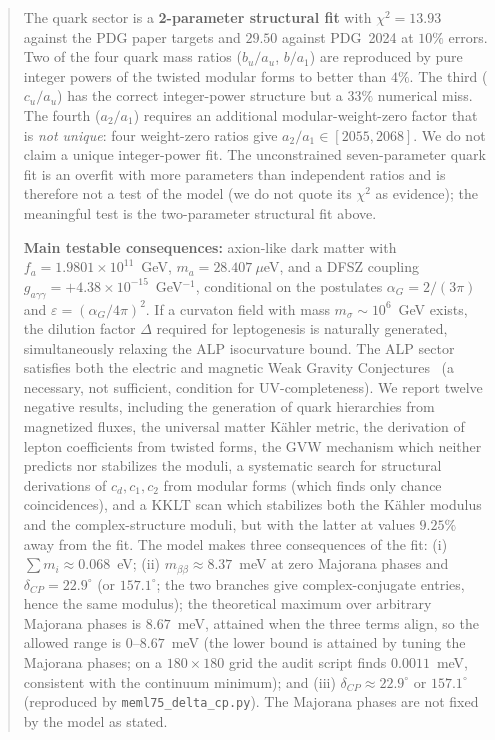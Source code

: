 \documentclass[12pt,a4paper]{article}
\numberwithin{equation}{section}
\begin{document}
\begin{abstract}
The quark sector is a \textbf{2-parameter structural fit} with
\(\chi^2 = 13.93\) against the PDG paper targets and \(29.50\) against
PDG~2024 at \(10\%\) errors. Two of the four quark mass ratios
(\(b_u/a_u\), \(b/a_1\)) are reproduced by pure integer powers of the
twisted modular forms to better than \(4\%\). The third
(\(c_u/a_u\)) has the correct integer-power structure but a \(33\%\)
numerical miss. The fourth (\(a_2/a_1\)) requires an additional
modular-weight-zero factor that is \emph{not unique}: four weight-zero
ratios give \(a_2/a_1 \in [2055, 2068]\). We do not claim a unique
integer-power fit. The unconstrained seven-parameter quark fit is an
overfit with more parameters than independent ratios and is therefore
not a test of the model (we do not quote its \(\chi^2\) as evidence);
the meaningful test is the two-parameter structural fit above.

\textbf{Main testable consequences:} axion-like dark matter with
\(f_a = 1.9801\times 10^{11}\)~GeV, \(m_a = 28.407~\mu\)eV, and a DFSZ
coupling \(g_{a\gamma\gamma} = +4.38 \times 10^{-15}\)~GeV\(^{-1}\),
conditional on the postulates \(\alpha_G = 2/(3\pi)\) and
\(\varepsilon = (\alpha_G/4\pi)^2\). If a curvaton field with mass
\(m_\sigma \sim 10^6\)~GeV exists, the dilution factor \(\Delta\)
required for leptogenesis is naturally generated, simultaneously
relaxing the ALP isocurvature bound. The ALP sector satisfies both
the electric and magnetic Weak Gravity Conjectures~\cite{ArkaniHamed2006,Palti2019}
(a necessary, not sufficient, condition for UV-completeness). We report
twelve negative results, including the generation of quark hierarchies
from magnetized fluxes, the universal matter K\"ahler metric, the
derivation of lepton coefficients from twisted forms, the GVW
mechanism which neither predicts nor stabilizes the moduli, a
systematic search for structural derivations of \(c_d, c_1, c_2\)
from modular forms (which finds only chance coincidences), and a
KKLT scan which stabilizes both the K\"ahler modulus and the
complex-structure moduli, but with the latter at values \(9.25\%\)
away from the fit. The model makes three consequences of
the fit:
(i) \(\sum m_i \approx 0.068\)~eV;
(ii) \(m_{\beta\beta} \approx 8.37\)~meV at zero Majorana phases
and \(\delta_{CP} = 22.9^\circ\) (or \(157.1^\circ\); the two
branches give complex-conjugate entries, hence the same modulus);
the theoretical maximum over arbitrary Majorana phases is
\(8.67\)~meV, attained when the three terms align, so the allowed
range is \(0\)--\(8.67\)~meV (the lower bound is attained by tuning
the Majorana phases; on a \(180\times180\) grid the audit script
finds \(0.0011\)~meV, consistent with the continuum minimum); and
(iii) \(\delta_{CP} \approx 22.9^\circ\) or \(157.1^\circ\)
(reproduced by \texttt{meml75\_delta\_cp.py}). The Majorana phases
are not fixed by the model as stated.
\end{abstract}
\end{document}
